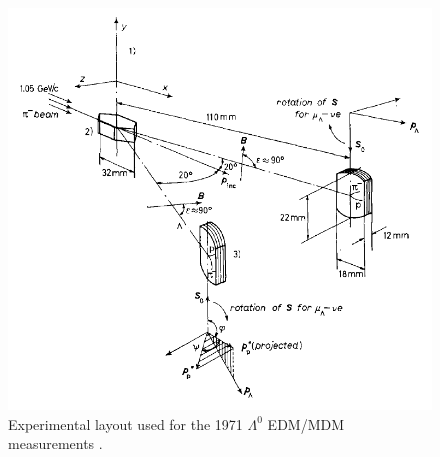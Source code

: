 \begin{figure}[t]
	\centering
	\includegraphics[width=.7\textwidth]{graphics/01-standard_model/1971_cern_emdm_setup.png}
	\caption[Experimental layout used for the 1971 $\Lambda^0$ EDM/MDM measurements.]{Experimental layout used for the 1971 $\Lambda^0$ EDM/MDM measurements \cite{1971_lambda_MDM}.}
	\label{fig:1:1971_cern_emdm_setup}
\end{figure}

